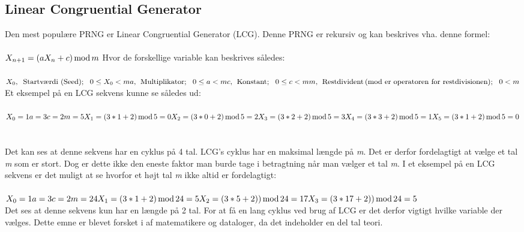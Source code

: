 \subsection{Linear Congruential Generator}
Den mest populære PRNG er Linear Congruential Generator (LCG). Denne PRNG er rekursiv og kan beskrives vha. denne formel:\\\\
\(X_{n+1}=(aX_{n}+c)\, \textup{mod}\, m\\\)
Hvor de forskellige variable kan beskrives således:\\\\
\(X_{0},\; \; \textup{Startv\ae rdi (Seed)}; \: \: \: 0 \leq X_{0}< m\\a,\: \: \textup{Multiplikator};\: \:\:  0\leq a< m\\c,\: \: \textup{Konstant};\: \: \: 0\leq c< m\\m,\: \: \textup{Restdivident\,(mod er operatoren for restdivisionen)};\: \: \: 0< m\\\)
Et eksempel på en LCG sekvens kunne se således ud:\\\\
\(X_{0}=1\\a=3\\c=2\\m=5\\\\X_{1}=(3*1+2)\, \textup{mod}\, 5=0\\X_{2}=(3*0+2)\, \textup{mod}\, 5=2\\X_{3}=(3*2+2)\, \textup{mod}\, 5=3\\X_{4}=(3*3+2)\, \textup{mod}\, 5=1\\X_{5}=(3*1+2)\, \textup{mod}\, 5=0\)\\
\\\\Det kan ses at denne sekvens har en cyklus på 4 tal. LCG's cyklus har en maksimal længde på \textit{m}. Det er derfor fordelagtigt at vælge et tal \textit{m} som er stort. Dog er dette ikke den eneste faktor man burde tage i betragtning når man vælger et tal \textit{m}. I et eksempel på en LCG sekvens er det muligt at se hvorfor et højt tal \textit{m} ikke altid er fordelagtigt:\\\\\(X_{0}=1\\a=3\\c=2\\m=24\\\\X_{1}=(3*1+2)\, \textup{mod}\, 24=5\\X_{2}=(3*5+2))\, \textup{mod}\, 24=17\\X_{3}=(3*17+2))\, \textup{mod}\, 24=5\)
\\Det ses at denne sekvens kun har en længde på 2 tal. For at få en lang cyklus ved brug af LCG er det derfor vigtigt hvilke variable der vælges. Dette emne er blevet forsket i af matematikere og dataloger, da det indeholder en del tal teori\cite{Sigman}. 